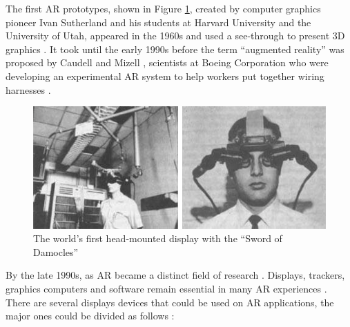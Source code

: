 The first AR prototypes, shown in Figure \ref{figure:first_head_mount}, created by computer graphics pioneer Ivan Sutherland and his students at Harvard University and the University of Utah, appeared in the 1960s and used a see-through to present 3D graphics \cite{Benford1998}. It took until the early 1990s before the term ``augmented reality'' was proposed by Caudell and Mizell \cite{Benford1998}, scientists at Boeing Corporation who were developing an experimental AR system to help workers put together wiring harnesses \cite{Benford1998}.

\begin{figure}[!htb]
  \centering
  \includegraphics[width=\linewidth]{chapters/basic_concepts/first_head_mount.png}
  \caption{The world's first head-mounted display with the ``Sword of Damocles''}
  \label{figure:first_head_mount}
\end{figure}

By the late 1990s, as AR became a distinct field of research \cite{Krevelen2010}. Displays, trackers, graphics computers and software remain essential in many AR experiences \cite{Krevelen2010,Benford1998}. There are several displays devices that could be used on AR applications, the major ones could be divided as follows \cite{Benford1998}:

